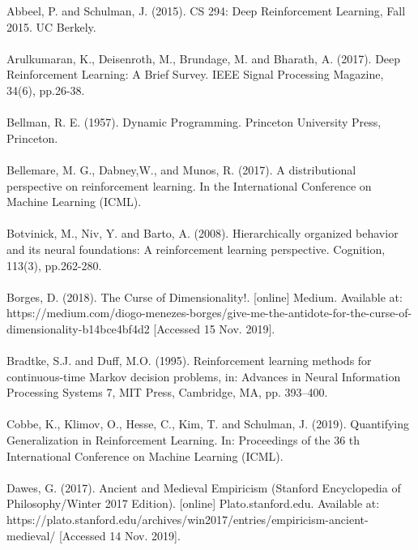 \documentclass[notitlepage,a4paper,11pt]{article}
\begin{document}
Abbeel, P. and Schulman, J. (2015). CS 294: Deep Reinforcement Learning, Fall 2015. UC Berkely.\\\\
Arulkumaran, K., Deisenroth, M., Brundage, M. and Bharath, A. (2017). Deep Reinforcement Learning: A Brief Survey. IEEE Signal Processing Magazine, 34(6), pp.26-38.\\\\
Bellman, R. E. (1957). Dynamic Programming. Princeton University Press, Princeton.\\\\
Bellemare, M. G., Dabney,W., and Munos, R. (2017). A distributional perspective on reinforcement learning. In the International Conference on Machine Learning (ICML).\\\\
Botvinick, M., Niv, Y. and Barto, A. (2008). Hierarchically organized behavior and its neural foundations: A reinforcement learning perspective. Cognition, 113(3), pp.262-280.\\\\
Borges, D. (2018). The Curse of Dimensionality!. [online] Medium. Available at: https://medium.com/diogo-menezes-borges/give-me-the-antidote-for-the-curse-of-dimensionality-b14bce4bf4d2 [Accessed 15 Nov. 2019].\\\\
Bradtke, S.J. and Duff, M.O. (1995). Reinforcement learning methods for continuous-time Markov decision problems, in: Advances in Neural Information Processing Systems 7, MIT Press, Cambridge, MA, pp. 393–400.\\\\
Cobbe, K., Klimov, O., Hesse, C., Kim, T. and Schulman, J. (2019). Quantifying Generalization in Reinforcement Learning. In: Proceedings of the 36 th International Conference on Machine Learning (ICML).\\\\
Dawes, G. (2017). Ancient and Medieval Empiricism (Stanford Encyclopedia of Philosophy/Winter 2017 Edition). [online] Plato.stanford.edu. Available at: https://plato.stanford.edu/archives/win2017/entries/empiricism-ancient-medieval/ [Accessed 14 Nov. 2019].\\\\
\end{document}
